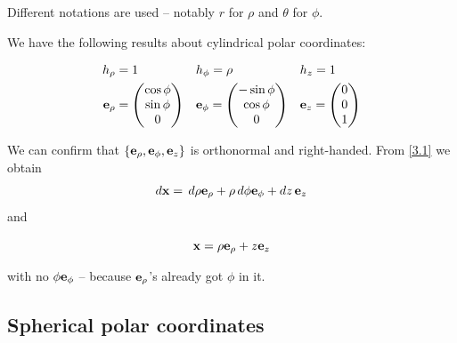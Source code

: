 \documentclass{../../template/note}
\begin{document}
    Different notations are used -- notably \(r\) for \(\rho\) and \(\theta\) for \(\phi\).

    We have the following results about cylindrical polar coordinates:
    \begin{proposition}
        \label{3.2} \begin{align*}
            h_\rho &= 1 && h_\phi = \rho && h_z = 1 \\
            \V e_\rho &= \begin{pmatrix}
             \cos \phi \\
             \sin \phi \\
             0 \\
            \end{pmatrix} && \V e_\phi = \begin{pmatrix}
             -\sin \phi \\
             \cos \phi \\
             0 \\
            \end{pmatrix} && \V e_z = \begin{pmatrix}
             0 \\
             0 \\
             1 \\
            \end{pmatrix}
        \end{align*}
    \end{proposition}
    
    We can confirm that \(\{\V e_\rho, \V e_\phi, \V e_z\}\) is orthonormal and right-handed. From \cref{3.1} we obtain
    \begin{align*}
        d \V x = \D \rho \V e_\rho + \rho \D \phi \V e_\phi + dz\, \V e_z
    \end{align*}
    and
    \begin{proposition}
        \label{3.3} \[
            \V x = \rho \V e_\rho + z \V e_z
        \]
    \end{proposition}
    with no \(\phi \V e_\phi\) -- because \(\V e_\rho\)'s already got \(\phi\) in it.
    
    \subsection{Spherical polar coordinates}
\end{document}
